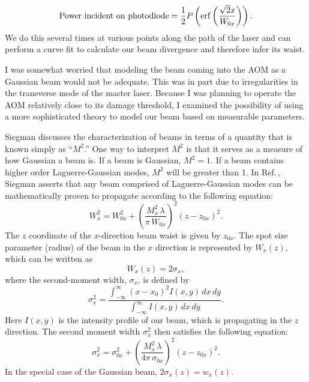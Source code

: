 \begin{equation}
{\rm Power\ incident\ on\ photodiode}=\frac{1}{2} P \left(\erf \left( \frac{\sqrt{2} x}{W_{0x}}\right)\right).
\end{equation}
We do this several times at various points along the path of the laser and can perform a curve fit to calculate our beam divergence and therefore infer its waist. 

I was somewhat worried that modeling the beam coming into the AOM as a Gaussian beam would not be adequate. This was in part due to irregularities in the transverse mode of the master laser.
Because I was planning to operate the AOM relatively close to its damage threshold, I examined the possibility of using a more sophisticated theory to model our beam based on measurable parameters. 

Siegman \cite{SiegmanBeamQuality} discusses the characterization of beams in terms of a quantity that is known simply as ``$M^2$.'' One way to interpret $M^2$ is that it serves as a measure of how Gaussian a beam is. If a beam is Gaussian, $M^2=1$. If a beam contains higher order Laguerre-Gaussian modes, $M^2$ will be greater than 1. In Ref.\,\cite{SiegmanBeamQuality}, Siegman asserts that any beam comprised of Laguerre-Gaussian modes can be mathematically proven to propagate according to the following equation:
\begin{equation}
W_x^2=W_{0x}^2+\left( \frac{M_x^2 \,\lambda}{\pi \, W_{0x}}\right)^2 (z-z_{0x})^2 \label{SiegmanBeamPropagate01}.
\end{equation}
The $z$ coordinate of the $x$-direction beam waist is given by $z_{0x}$. The spot size parameter (radius) of the beam in the $x$ direction is represented by $W_x(z)$, which can be written as  
\begin{equation}
W_x(z)=2 \sigma_x,
\end{equation}
where the second-moment width, $\sigma_x$, is defined by 
\begin{equation}\label{secondMomentWidth}
\sigma_x^2=\frac{\int_{-\infty}^{\infty} (x-x_0)^2 I(x,y)\, dx\, dy}{\int_{-\infty}^{\infty} I(x,y)\, dx \, dy}.
\end{equation} 
Here $I(x,y)$ is the intensity profile of our beam, which is propagating in the $z$ direction. 
The second moment width $\sigma_x^2$ then satisfies the following equation:  
\begin{equation}
\sigma_x^2=\sigma_{0x}^2+\left( \frac{M_x^2 \,\lambda}{4 \pi \, \sigma_{0x}}\right)^2 (z-z_{0x})^2 \label{SiegmanBeamPropagate00}.
\end{equation}
In the special case of the Gaussian beam, $2\sigma_x(z)=w_x(z)$.

